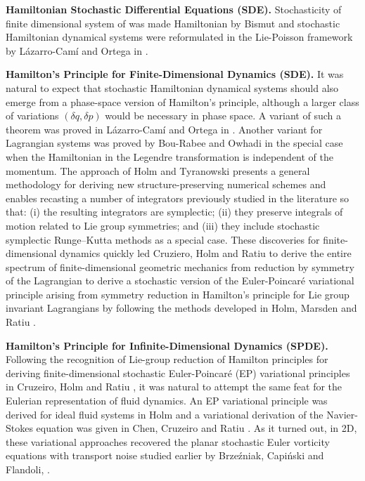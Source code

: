 \documentclass[11pt, oneside]{article}   	%
\numberwithin{equation}{section}
\theoremstyle{plain}
\theoremstyle{definition}
\theoremstyle{remark}
\newcommand{\<}{\langle}
\renewcommand{\>}{\rangle}
\begin{document}
{\bf  Hamiltonian Stochastic Differential Equations (SDE).}
Stochasticity of finite dimensional system of was made Hamiltonian by Bismut \cite{bismut1982mecanique} and stochastic Hamiltonian dynamical systems were reformulated in the Lie-Poisson framework by L\'azarro-Cam\'i and Ortega in \cite{lazaro2008stochastic}. 

{\bf  Hamilton's Principle for Finite-Dimensional Dynamics (SDE).}
It was natural to expect that stochastic Hamiltonian dynamical systems should also emerge from a phase-space version of Hamilton's principle, although a larger class of variations $(\delta q,\delta p)$ would be necessary in phase space. A variant of such a theorem was proved in L\'azarro-Cam\'i and Ortega in \cite{lazaro2008stochastic}. Another variant for Lagrangian systems was proved by Bou-Rabee and Owhadi \cite{bou2009stochastic} in the special case when the Hamiltonian in the Legendre transformation  is independent of the momentum. The approach of Holm and Tyranowski \cite{holm2018stochastic} presents a general methodology for deriving new structure-preserving numerical schemes and enables recasting a number of integrators previously studied in the literature so that: (i) the resulting integrators are symplectic; (ii) they preserve integrals of motion related to Lie group symmetries; and (iii) they include stochastic symplectic Runge--Kutta methods as a special case. 
These discoveries for finite-dimensional dynamics quickly led Cruziero, Holm and Ratiu \cite{cruzeiro2018momentum} to derive the entire spectrum of finite-dimensional geometric mechanics from reduction by symmetry of the Lagrangian to derive a stochastic version of the Euler-Poincar\'e variational principle arising from symmetry reduction in Hamilton's principle for Lie group invariant Lagrangians by following the methods developed in Holm, Marsden and Ratiu \cite{HMR1998}. 

{\bf  Hamilton's Principle for Infinite-Dimensional Dynamics (SPDE).}
Following the recognition of Lie-group reduction of Hamilton principles for deriving finite-dimensional stochastic Euler-Poincar\'e (EP) variational principles in Cruzeiro, Holm and Ratiu \cite{cruzeiro2018momentum}, it was natural to attempt the same feat for the Eulerian representation of fluid dynamics. An EP variational principle was derived for ideal fluid systems in Holm \cite{Holm2015} and a variational derivation of the Navier-Stokes equation was given in Chen, Cruzeiro and Ratiu \cite{chen2023stochastic}. As it turned out, in 2D, these variational approaches recovered the planar stochastic Euler vorticity equations with transport noise studied earlier by Brze\'zniak, Capi\'nski and Flandoli, \cite{brzezniak1991stochastic,brzezniak1992stochastic}.
\end{document}
